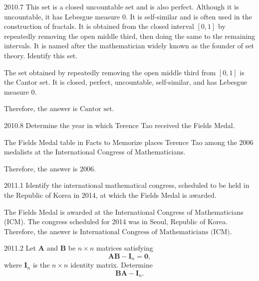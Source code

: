     \begin{pastproblem}{2010.7}
        This set is a closed uncountable set and is also perfect. Although it is uncountable, it has
        Lebesgue measure $0$. It is self-similar and is often used in the construction of fractals.
        It is obtained from the closed interval $[0,1]$ by repeatedly removing the open middle
        third, then doing the same to the remaining intervals. It is named after the mathematician
        widely known as the founder of set theory. Identify this set.
    \end{pastproblem}

    \begin{solution}
        The set obtained by repeatedly removing the open middle third from $[0,1]$ is the Cantor
        set. It is closed, perfect, uncountable, self-similar, and has Lebesgue measure $0$.

        Therefore, the answer is $\boxed{\text{Cantor set}}$.
    \end{solution}

    \begin{pastproblem}{2010.8}
        Determine the year in which Terence Tao received the Fields Medal.
    \end{pastproblem}

    \begin{solution}
        The Fields Medal table in Facts to Memorize places Terence Tao among the
        2006 medalists at the International Congress of Mathematicians.

        Therefore, the answer is $\boxed{2006}$.
    \end{solution}

    \begin{pastproblem}{2011.1}
        Identify the international mathematical congress, scheduled to be held in the Republic of Korea in 2014, at which the
        Fields Medal is awarded.
    \end{pastproblem}

    \begin{solution}
The Fields Medal is awarded at the International Congress of
        Mathematicians (ICM). The congress scheduled for 2014 was in Seoul,
        Republic of Korea. Therefore, the answer is
        $\boxed{\text{International Congress of Mathematicians (ICM)}}$.
    \end{solution}

    \begin{pastproblem}{2011.2}
        Let $\mathbf{A}$ and $\mathbf{B}$ be $n\times n$ matrices satisfying
        \[
            \mathbf{A}\mathbf{B}-\mathbf{I}_n=\mathbf{0},
        \]
        where $\mathbf{I}_n$ is the $n\times n$ identity matrix. Determine
        \[
            \mathbf{B}\mathbf{A}-\mathbf{I}_n.
        \]
    \end{pastproblem}

